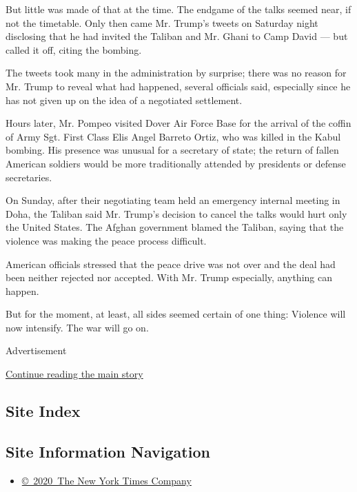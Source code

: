 But little was made of that at the time. The endgame of the talks seemed
near, if not the timetable. Only then came Mr. Trump's tweets on
Saturday night disclosing that he had invited the Taliban and Mr. Ghani
to Camp David --- but called it off, citing the bombing.

The tweets took many in the administration by surprise; there was no
reason for Mr. Trump to reveal what had happened, several officials
said, especially since he has not given up on the idea of a negotiated
settlement.

Hours later, Mr. Pompeo visited Dover Air Force Base for the arrival of
the coffin of Army Sgt. First Class Elis Angel Barreto Ortiz, who was
killed in the Kabul bombing. His presence was unusual for a secretary of
state; the return of fallen American soldiers would be more
traditionally attended by presidents or defense secretaries.

On Sunday, after their negotiating team held an emergency internal
meeting in Doha, the Taliban said Mr. Trump's decision to cancel the
talks would hurt only the United States. The Afghan government blamed
the Taliban, saying that the violence was making the peace process
difficult.

American officials stressed that the peace drive was not over and the
deal had been neither rejected nor accepted. With Mr. Trump especially,
anything can happen.

But for the moment, at least, all sides seemed certain of one thing:
Violence will now intensify. The war will go on.

Advertisement

\protect\hyperlink{after-bottom}{Continue reading the main story}

\hypertarget{site-index}{%
\subsection{Site Index}\label{site-index}}

\hypertarget{site-information-navigation}{%
\subsection{Site Information
Navigation}\label{site-information-navigation}}

\begin{itemize}
\tightlist
\item
  \href{https://help.nytimes.com/hc/en-us/articles/115014792127-Copyright-notice}{©~2020~The
  New York Times Company}
\end{itemize}

